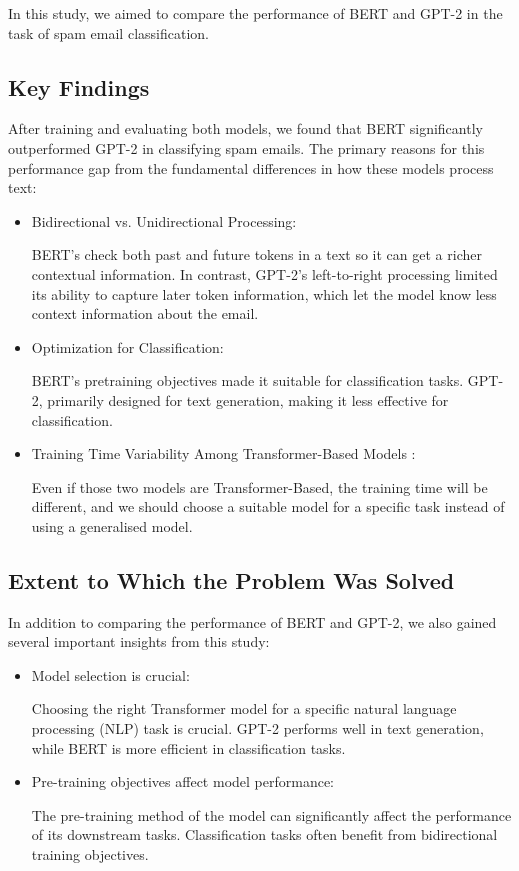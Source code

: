 In this study, we aimed to compare the performance of BERT and GPT-2 in the task of spam email classification.

\subsection{Key Findings}

After training and evaluating both models, we found that BERT significantly outperformed GPT-2 in classifying spam emails. The primary reasons for this performance gap from the fundamental differences in how these models process text:

\begin{itemize}
    \item Bidirectional vs. Unidirectional Processing: 
    
    BERT's check both past and future tokens in a text so it can get a richer contextual information. In contrast, GPT-2's left-to-right processing limited its ability to capture later token information, which let the model know less context information about the email.
    
    \item Optimization for Classification: 
    
    BERT’s pretraining objectives made it suitable for classification tasks. GPT-2, primarily designed for text generation, making it less effective for classification.

    \item Training Time Variability Among Transformer-Based Models : 

    Even if those two models are Transformer-Based, the training time will be different, and we should choose a suitable model for a specific task instead of using a generalised model.
    
\end{itemize}

\subsection{Extent to Which the Problem Was Solved}

In addition to comparing the performance of BERT and GPT-2, we also gained several important insights from this study:

\begin{itemize} 
    \item Model selection is crucial:
    
    Choosing the right Transformer model for a specific natural language processing (NLP) task is crucial. GPT-2 performs well in text generation, while BERT is more efficient in classification tasks. 

    \item Pre-training objectives affect model performance: 
    
    The pre-training method of the model can significantly affect the performance of its downstream tasks. Classification tasks often benefit from bidirectional training objectives.

\end{itemize}